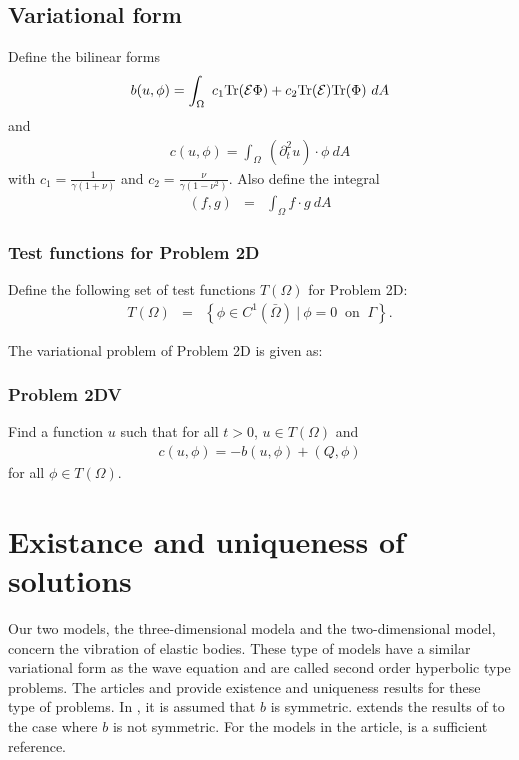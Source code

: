 \subsection{Variational form}\label{ssec:2D_Model:VariationalForm}
Define the bilinear forms
\begin{eqnarray}
	b(u,\phi) = \int_\Omega~c_1\textrm{Tr}({\cal E}\Phi)+ c_2\textrm{Tr}({\cal E})
	\textrm{Tr}(\Phi) ~dA \label{eq:2D_Model:Bilinear}
\end{eqnarray}
and
\begin{eqnarray}
	c(u,\phi) = \int_\Omega~ (\partial^2_t u) \cdot \phi~dA \label{eq:2D_Model:Bilinear_c}
\end{eqnarray}
with $\displaystyle c_1 = \frac{1}{\gamma(1+\nu)}$ and $\displaystyle c_2 = \frac{\nu}{\gamma(1-\nu^2)}$.
Also define the integral
\begin{eqnarray}
	(f,g) &=& \int_{\Omega} f\cdot g \ dA \label{eq:2D_Model:Bilinear_int}
\end{eqnarray}

\subsubsection{Test functions for Problem 2D}\label{sssec:2D_Model:TestFunctions2D1}
Define the following set of test functions $T(\Omega)$ for Problem 2D:
\begin{eqnarray*}
	T(\Omega) & = & \left\{ \phi \in C^1(\bar{\Omega}) \ | \ \phi = 0 \ \textrm{ on } \ \Gamma \right\}. 
\end{eqnarray*}\label{sym:baromega}

The variational problem of Problem 2D is given as:

\subsubsection{Problem 2DV}\label{sssec:2D_Model:Problem2D1V}
Find a function $u$ such that for all $t>0$, $u \in T(\Omega)$ and 
\begin{align}
	c(u,\phi) = -b(u,\phi) + (Q,\phi) \label{eq:2D_Model:Problem2D1VEq}
\end{align}
for all $\phi \in T(\Omega)$.

\section{Existance and uniqueness of solutions}
Our two models, the three-dimensional modela and the two-dimensional model, concern the vibration of elastic bodies. These type of models have a similar variational form as the wave equation and are called second order hyperbolic type problems. The articles \cite{VV02} and \cite{VS18} provide existence and uniqueness results for these type of problems. In \cite{VV02}, it is assumed that $b$ is symmetric. \cite{VS18} extends the results of \cite{VV02} to the case where $b$ is not symmetric. For the models in the article, \cite{VV02} is a sufficient reference.

